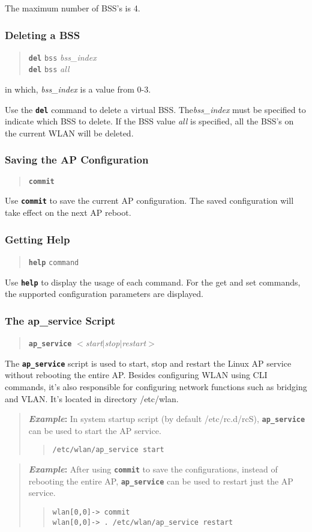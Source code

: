 \documentclass[10pt,fullpage]{article}
\newcommand{\mytt}[1]{{\texttt{#1}}}
\newcommand{\bv}{\begin{verse}}
\newcommand{\ev}{\end{verse}}
\newcommand{\clicmd}[1]{{\textbf{\texttt{#1}}}}
\newcommand{\cliparam}[1]{{\texttt{#1}}}
\newcommand{\clival}[1]{{\emph{#1}}}
\newcommand{\clidemo}[1]{{\texttt{wlan[0,0]-> #1}}}
\newenvironment{example}{\begin{quote}\textbf{\textit{Example}:}}{\end{quote}}
\begin{document}
The maximum number of BSS's is 4. 

\subsubsection{Deleting a BSS}
\bv
\clicmd{del} \cliparam{bss} \clival{bss\_index}\\
\clicmd{del} \cliparam{bss} \clival{all}
\ev
in which, \clival{bss\_index} is a value from 0-3.

Use the \clicmd{del} command to delete a virtual BSS.
The\clival{bss\_index} must be specified to indicate which BSS to
delete.  If the BSS value \clival{all} is specified, all the BSS's on
the current WLAN will be deleted.

\subsubsection{Saving the AP Configuration}
\bv
\clicmd{commit}
\ev
Use \clicmd{commit} to save the current AP configuration. 
The saved configuration will take effect on the next AP reboot.

\subsubsection{Getting Help}
\bv
\clicmd{help} \cliparam{command}
\ev
Use \clicmd{help} to display the usage of each command.  For the get
and set commands, the supported configuration parameters are
displayed.

\subsubsection{The ap\_service Script}
\bv
\clicmd{ap\_service} $<$\clival{start}$|$\clival{stop}$|$\clival{restart}$>$
\ev
The \clicmd{ap\_service} script is used to start, stop and restart the
Linux AP service without rebooting the entire AP. Besides configuring
WLAN using CLI commands, it's also responsible for configuring
network functions such as bridging and VLAN.
It's located in directory /etc/wlan.

\begin{example}
  In system startup script (by default /etc/rc.d/rcS), \clicmd{ap\_service}
  can be used to start the AP service.
  \bv
  \mytt{/etc/wlan/ap\_service start}
  \ev
\end{example}

\begin{example}
  After using \clicmd{commit} to save the configurations, instead of rebooting
  the entire AP, \clicmd{ap\_service} can be used to restart just the AP service.
  \bv
  \clidemo{commit}\\
  \clidemo{. /etc/wlan/ap\_service restart}
  \ev
\end{example}
\end{document}
